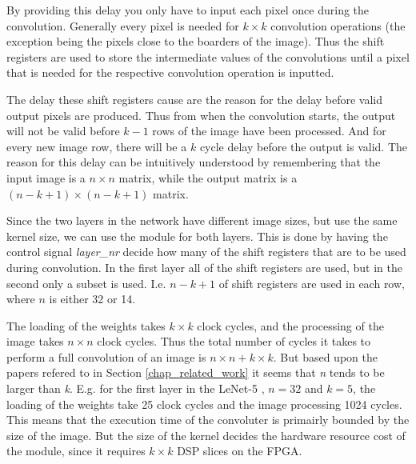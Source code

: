 By providing this delay you only have to input each pixel once during the convolution. Generally every pixel is needed for $ k \times k $ convolution operations (the exception being the pixels close to the boarders of the image). Thus the shift registers are used to store the intermediate values of the convolutions until a pixel that is needed for the respective convolution operation is inputted. 

The delay these shift registers cause are the reason for the delay before valid output pixels are produced. Thus from when the convolution starts, the output will not be valid before $ k-1 $ rows of the image have been processed. And for every new image row, there will be a $ k $ cycle delay before the output is valid. The reason for this delay can be intuitively understood by remembering that the input image is a $ n \times n $ matrix, while the output matrix is a $ (n-k+1) \times (n-k+1) $ matrix. 

Since the two layers in the network have different image sizes, but use the same kernel size, we can use the module for both layers. This is done by having the control signal \textit{layer\_nr} decide how many of the shift registers that are to be used during convolution. In the first layer all of the shift registers are used, but in the second only a subset is used. I.e. $ n-k+1 $ of shift registers are used in each row, where $ n $ is either 32 or 14. 

The loading of the weights takes $ k \times k $ clock cycles, and the processing of the image takes $ n \times n $ clock cycles. Thus the total number of cycles it takes to perform a full convolution of an image is $ n \times n + k \times k $. But based upon the papers refered to in Section \ref{chap_related_work} it seems that \textit{n} tends to be larger than \textit{k}. E.g. for the first layer in the LeNet-5 \cite{LeCun1998}, $ n = 32 $ and $ k = 5 $, the loading  of the weights take 25 clock cycles and the image processing 1024 cycles. This means that the execution time of the convoluter is primairly bounded by the size of the image. But the size of the kernel decides the hardware resource cost of the module, since it requires $ k \times k $ DSP slices on the FPGA.

